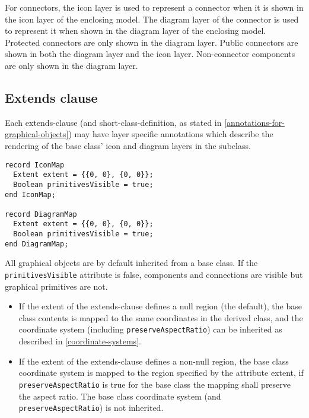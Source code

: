 For connectors, the icon layer is used to represent a connector when it
is shown in the icon layer of the enclosing model. The diagram layer of
the connector is used to represent it when shown in the diagram layer of
the enclosing model. Protected connectors are only shown in the diagram
layer. Public connectors are shown in both the diagram layer and the
icon layer. Non-connector components are only shown in the diagram
layer.

\subsection{Extends clause}\label{extends-clause}

Each extends-clause (and short-class-definition, as stated in \cref{annotations-for-graphical-objects})
may have layer specific annotations which describe
the rendering of the base class' icon and diagram layers in the
subclass.

\begin{lstlisting}[language=modelica]
record IconMap
  Extent extent = {{0, 0}, {0, 0}};
  Boolean primitivesVisible = true;
end IconMap;

record DiagramMap
  Extent extent = {{0, 0}, {0, 0}};
  Boolean primitivesVisible = true;
end DiagramMap;
\end{lstlisting}%
All graphical objects are by default inherited from a base class.
If the \lstinline!primitivesVisible! attribute is false, components and connections are visible but graphical primitives are not.

\begin{itemize}
\item
  If the extent of the extends-clause defines a null region (the default), the base class contents is mapped to the same coordinates in the derived class, and the coordinate system (including \lstinline!preserveAspectRatio!) can be inherited as described in \cref{coordinate-systems}.
\item
  If the extent of the extends-clause defines a non-null region, the base class coordinate system is mapped to the region specified by the attribute extent, if \lstinline!preserveAspectRatio! is true for the base class the mapping shall preserve the aspect ratio.  The base class coordinate system (and \lstinline!preserveAspectRatio!) is not inherited.
\end{itemize}

